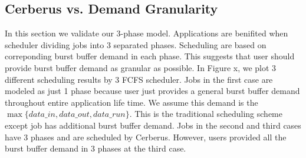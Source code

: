 \subsection{Cerberus vs. Demand Granularity}
In this section we validate our 3-phase model.
Applications are benifited when scheduler dividing jobs into 3 separated phases.
Scheduling are based on correponding burst buffer demand in each phase.
This suggests that user should provide burst buffer demand as granular as possible.
In Figure x, we plot 3 different scheduling results by 3 FCFS scheduler.
Jobs in the first case are modeled as just 1 phase because user just provides a general burst buffer demand throughout entire application life time.
We assume this demand is the $\max \{data\_in, data\_out, data\_run\}$.
This is the traditional scheduling scheme except job has additional burst buffer demand.
Jobs in the second and third cases have 3 phases and are scheduled by Cerberus.
However, users provided all the burst buffer demand in 3 phases at the third case.




